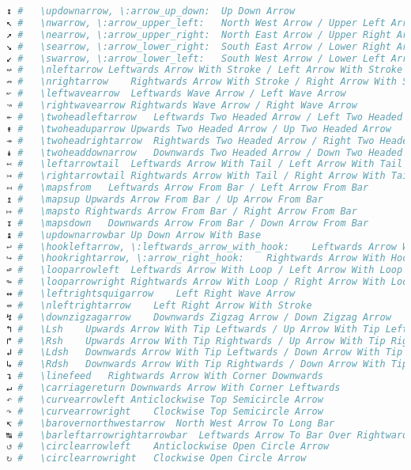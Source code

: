 \begin{lstlisting}[language=Julia, style=julia, linewidth=\textwidth]
↕ #   \updownarrow, \:arrow_up_down:  Up Down Arrow
↖ #   \nwarrow, \:arrow_upper_left:   North West Arrow / Upper Left Arrow
↗ #   \nearrow, \:arrow_upper_right:  North East Arrow / Upper Right Arrow
↘ #   \searrow, \:arrow_lower_right:  South East Arrow / Lower Right Arrow
↙ #   \swarrow, \:arrow_lower_left:   South West Arrow / Lower Left Arrow
↚ #   \nleftarrow Leftwards Arrow With Stroke / Left Arrow With Stroke
↛ #   \nrightarrow    Rightwards Arrow With Stroke / Right Arrow With Stroke
↜ #   \leftwavearrow  Leftwards Wave Arrow / Left Wave Arrow
↝ #   \rightwavearrow Rightwards Wave Arrow / Right Wave Arrow
↞ #   \twoheadleftarrow   Leftwards Two Headed Arrow / Left Two Headed Arrow
↟ #   \twoheaduparrow Upwards Two Headed Arrow / Up Two Headed Arrow
↠ #   \twoheadrightarrow  Rightwards Two Headed Arrow / Right Two Headed Arrow
↡ #   \twoheaddownarrow   Downwards Two Headed Arrow / Down Two Headed Arrow
↢ #   \leftarrowtail  Leftwards Arrow With Tail / Left Arrow With Tail
↣ #   \rightarrowtail Rightwards Arrow With Tail / Right Arrow With Tail
↤ #   \mapsfrom   Leftwards Arrow From Bar / Left Arrow From Bar
↥ #   \mapsup Upwards Arrow From Bar / Up Arrow From Bar
↦ #   \mapsto Rightwards Arrow From Bar / Right Arrow From Bar
↧ #   \mapsdown   Downwards Arrow From Bar / Down Arrow From Bar
↨ #   \updownarrowbar Up Down Arrow With Base
↩ #   \hookleftarrow, \:leftwards_arrow_with_hook:    Leftwards Arrow With Hook
↪ #   \hookrightarrow, \:arrow_right_hook:    Rightwards Arrow With Hook
↫ #   \looparrowleft  Leftwards Arrow With Loop / Left Arrow With Loop
↬ #   \looparrowright Rightwards Arrow With Loop / Right Arrow With Loop
↭ #   \leftrightsquigarrow    Left Right Wave Arrow
↮ #   \nleftrightarrow    Left Right Arrow With Stroke
↯ #   \downzigzagarrow    Downwards Zigzag Arrow / Down Zigzag Arrow
↰ #   \Lsh    Upwards Arrow With Tip Leftwards / Up Arrow With Tip Left
↱ #   \Rsh    Upwards Arrow With Tip Rightwards / Up Arrow With Tip Right
↲ #   \Ldsh   Downwards Arrow With Tip Leftwards / Down Arrow With Tip Left
↳ #   \Rdsh   Downwards Arrow With Tip Rightwards / Down Arrow With Tip Right
↴ #   \linefeed   Rightwards Arrow With Corner Downwards
↵ #   \carriagereturn Downwards Arrow With Corner Leftwards
↶ #   \curvearrowleft Anticlockwise Top Semicircle Arrow
↷ #   \curvearrowright    Clockwise Top Semicircle Arrow
↸ #   \barovernorthwestarrow  North West Arrow To Long Bar
↹ #   \barleftarrowrightarrowbar  Leftwards Arrow To Bar Over Rightwards Arrow Bar
↺ #   \circlearrowleft    Anticlockwise Open Circle Arrow
↻ #   \circlearrowright   Clockwise Open Circle Arrow

\end{lstlisting}
